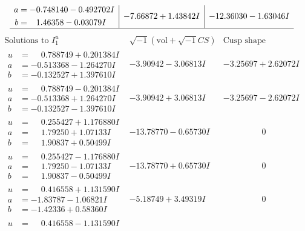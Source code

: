 \documentclass[1p]{elsarticle_modified}
\theoremstyle{definition}
\newcommand{\I}{\sqrt{-1}}
\begin{document}
$$\begin{array}{c|c|c}
\begin{aligned}
a &= -0.748140 - 0.492702 I \\
b &= \phantom{-}1.46358 - 0.03079 I\end{aligned}
 & -7.66872 + 1.43842 I & -12.36030 - 1.63046 I\\
 \hline 
 \end{array}$$\newpage$$\begin{array}{c|c|c}  
\text{Solutions to }I^u_{1}& \I (\text{vol} + \sqrt{-1}CS) & \text{Cusp shape}\\
 \hline 
\begin{aligned}
u &= \phantom{-}0.788749 + 0.201384 I \\
a &= -0.513368 - 1.264270 I \\
b &= -0.132527 + 1.397610 I\end{aligned}
 & -3.90942 - 3.06813 I & -3.25697 + 2.62072 I \\ \hline\begin{aligned}
u &= \phantom{-}0.788749 - 0.201384 I \\
a &= -0.513368 + 1.264270 I \\
b &= -0.132527 - 1.397610 I\end{aligned}
 & -3.90942 + 3.06813 I & -3.25697 - 2.62072 I \\ \hline\begin{aligned}
u &= \phantom{-}0.255427 + 1.176880 I \\
a &= \phantom{-}1.79250 + 1.07133 I \\
b &= \phantom{-}1.90837 + 0.50499 I\end{aligned}
 & -13.78770 - 0.65730 I & \phantom{-0.000000 } 0 \\ \hline\begin{aligned}
u &= \phantom{-}0.255427 - 1.176880 I \\
a &= \phantom{-}1.79250 - 1.07133 I \\
b &= \phantom{-}1.90837 - 0.50499 I\end{aligned}
 & -13.78770 + 0.65730 I & \phantom{-0.000000 } 0 \\ \hline\begin{aligned}
u &= \phantom{-}0.416558 + 1.131590 I \\
a &= -1.83787 - 1.06821 I \\
b &= -1.42336 + 0.58360 I\end{aligned}
 & -5.18749 + 3.49319 I & \phantom{-0.000000 } 0 \\ \hline\begin{aligned}
u &= \phantom{-}0.416558 - 1.131590 I \\

\end{aligned}
\end{array}$$
\end{document}
